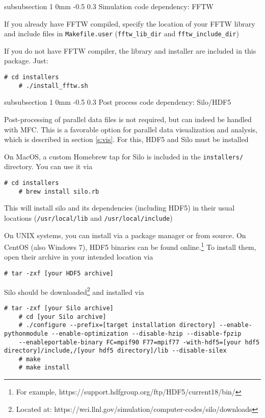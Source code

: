 \documentclass[11pt]{article}
\makeatletter
\renewcommand{\subsubsection}{\@startsection
{subsubsection}%
{1}%
{0mm}%
{-0.5\baselineskip}%
{0.3\baselineskip}%
{\normalfont\normalsize\bfseries\color{myBrown}}}%
\makeatother
\begin{document}
\subsubsection{Simulation code dependency: FFTW}

If you already have FFTW compiled, specify the location of your FFTW library and include files in \texttt{Makefile.user} (\texttt{fftw_lib_dir} and \texttt{fftw_include_dir})

If you do not have FFTW compiler, the library and installer are included in this package. 
Just:
\begin{lstlisting}[style=BashInputStyle]
    # cd installers
    # ./install_fftw.sh
\end{lstlisting}


\subsubsection{Post process code dependency: Silo/HDF5}\label{s:post}

Post-processing of parallel data files is not required, but can indeed be handled with MFC.
This is a favorable option for parallel data visualization and analysis, which is described in section \ref{s:vis}.
For this, HDF5 and Silo must be installed

On MacOS, a custom Homebrew tap for Silo is included in the \texttt{installers/} directory. 
You can use it via
\begin{lstlisting}[style=BashInputStyle]
	# cd installers
	# brew install silo.rb
\end{lstlisting}

This will install silo and its dependencies (including HDF5) in their usual locations (\texttt{/usr/local/lib} and \texttt{/usr/local/include})

On UNIX systems, you can install via a package manager or from source. On CentOS (also Windows 7), HDF5 binaries can be found online.\footnote{For example, https://support.hdfgroup.org/ftp/HDF5/current18/bin/}
To install them, open their archive in your intended location via
\begin{lstlisting}[style=BashInputStyle]
	# tar -zxf [your HDF5 archive]
\end{lstlisting}

Silo should be downloaded\footnote{Located at: https://wci.llnl.gov/simulation/computer-codes/silo/downloads} and installed via
\begin{lstlisting}[style=BashInputStyle]
	# tar -zxf [your Silo archive]
	# cd [your Silo archive]
	# ./configure --prefix=[target installation directory] --enable-pythonmodule --enable-optimization --disable-hzip --disable-fpzip 
	--enableportable-binary FC=mpif90 F77=mpif77 -with-hdf5=[your hdf5 directory]/include,/[your hdf5 directory]/lib --disable-silex
	# make
	# make install
\end{lstlisting}
\end{document}
